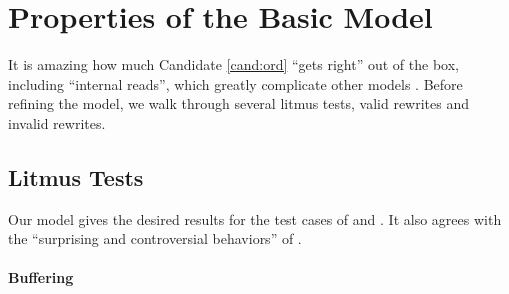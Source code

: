 \section{Properties of the Basic Model}
\label{sec:props}

It is amazing how much Candidate \ref{cand:ord} ``gets right'' out of the
box, including ``internal reads'', which greatly complicate other models
\cite{DBLP:journals/pacmpl/PulteFDFSS18}.  Before refining the model, we walk
through several litmus tests, valid rewrites and invalid rewrites.

\subsection{Litmus Tests}
\label{sec:litmus}




Our model gives the desired results for the test cases of \citet{PughWebsite}
and \citet[]{DBLP:conf/esop/BattyMNPS15}.  It also agrees with
the ``surprising and controversial behaviors'' of \citet[]{Manson:2005:JMM:1047659.1040336}.

\paragraph{Buffering}

